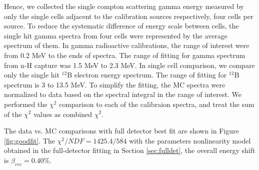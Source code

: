 Hence, we collected the single compton scattering gamma energy measured by only the single cells adjacent to the calibration sources respectively, four cells per source.
To reduce the systematic difference of energy scale between cells, the single hit gamma spectra from four cells were represented by the average spectrum of them. 
In gamma radioactive calibrations, the range of interest were from 0.2 MeV to the ends of spectra.
The range of fitting for gamma spectrum from n-H capture was 1.5 MeV to 2.3 MeV.
In single cell comparison, we compare only the single hit $^{12}$B electron energy spectrum.
The range of fitting for $^{12}$B spectrum is 3 to 13.5 MeV. 
To simplify the fitting, the MC spectra were normalized to data based on the spectral integral in the range of interest.
We performed the $\chi^2$ comparison to each of the calibraion spectra, and treat the sum of the $\chi^2$ values as combined $\chi^2$. 

The data vs. MC comparisons with full detector best fit are shown in Figure \ref{fig:goodfit}. 
The $\chi^2/NDF = 1425.4/584$ with the parameters nonlinearity model obtained in the full-detector fitting in Section \ref{sec:fulldet}, the overall energy shift is $\beta_{rec} = 0.40\%$.

